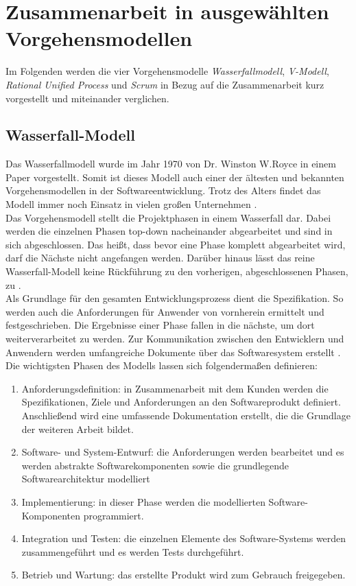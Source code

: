 
\section{Zusammenarbeit in ausgewählten Vorgehensmodellen}
\label{sec:zusammenarbeit}


Im Folgenden werden die vier Vorgehensmodelle \emph{Wasserfallmodell}, \emph{V-Modell}, \emph{Rational Unified Process} und \emph{Scrum} in Bezug auf die Zusammenarbeit kurz vorgestellt und miteinander verglichen.


\subsection{Wasserfall-Modell}
\label{sec:zusammenarbeit:wasserfall}
Das Wasserfallmodell wurde im Jahr 1970 von Dr. Winston W.Royce in einem Paper vorgestellt. Somit ist dieses Modell auch einer der ältesten und bekannten Vorgehensmodellen in der Softwareentwicklung. 
Trotz des Alters findet das Modell immer noch Einsatz in vielen großen Unternehmen \cite{IJC:2015:Related:}\cite{TryQA:24102022:What:1}.
\\Das Vorgehensmodell stellt die Projektphasen in einem \glqq Wasserfall\grqq{} dar. Dabei werden die einzelnen Phasen top-down nacheinander abgearbeitet und sind in sich abgeschlossen. 
Das heißt, dass bevor eine Phase komplett abgearbeitet wird, darf die Nächste nicht angefangen werden. Darüber hinaus lässt das reine Wasserfall-Modell keine Rückführung zu den vorherigen, abgeschlossenen Phasen, zu \cite[84]{Goll:2011:Methoden:}. 
\\
Als Grundlage für den gesamten Entwicklungsprozess dient die Spezifikation. So werden auch die Anforderungen für Anwender von vornherein ermittelt und festgeschrieben. 
Die Ergebnisse einer Phase fallen in die nächste, um dort weiterverarbeitet zu werden. Zur Kommunikation zwischen den Entwicklern und Anwendern werden umfangreiche Dokumente über das Softwaresystem erstellt \cite[83]{Goll:2011:Methoden:}. 
Die wichtigsten Phasen des Modells lassen sich folgendermaßen definieren\cite[85]{IJC:2015:Related:}\cite{Goll:2011:Methoden:}: 
\begin{enumerate}
    \item Anforderungsdefinition: in Zusammenarbeit mit dem Kunden werden die Spezifikationen, Ziele und Anforderungen an den Softwareprodukt definiert. Anschließend wird eine umfassende Dokumentation erstellt, die die Grundlage der weiteren Arbeit bildet. 
    \item Software- und System-Entwurf: die Anforderungen werden bearbeitet und es werden abstrakte Softwarekomponenten sowie die grundlegende Softwarearchitektur modelliert
    \item Implementierung: in dieser Phase werden die modellierten Software-Komponenten programmiert. 
    \item Integration und Testen: die einzelnen Elemente des Software-Systems werden zusammengeführt und es werden Tests durchgeführt.
    \item Betrieb und Wartung: das erstellte Produkt wird zum Gebrauch freigegeben.
\end{enumerate}
